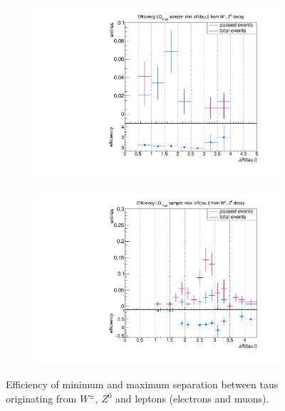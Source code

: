 \begin{figure}
\begin{subfigure}[t]{0.49\textwidth}
                \label{dRprompt:signal:taulepton:maxLQ75}
                \end{subfigure}
                \begin{subfigure}[t]{0.49\textwidth}
                \includegraphics[width=\textwidth]{figures/plots/LQ76/Divided_pr_mindR_taulepton.pdf}
                \label{dRprompt:signal:taulepton:minLQ76}
                \end{subfigure}
                \begin{subfigure}[t]{0.49\textwidth}
                \includegraphics[width=\textwidth]{figures/plots/LQ76/Divided_maxdR_pr_taulepton.pdf}
                \label{dRprompt:signal:taulepton:maxLQ76}
                \end{subfigure}
\caption[Efficiency of separation between taus originating from $W^\pm$, $Z^0$ and leptons.]{Efficiency of minimum and maximum separation between taus originating from $W^\pm$, $Z^0$ and leptons (electrons and muons).}
\label{dRprompt:signal:taulepton}
\end{figure}
